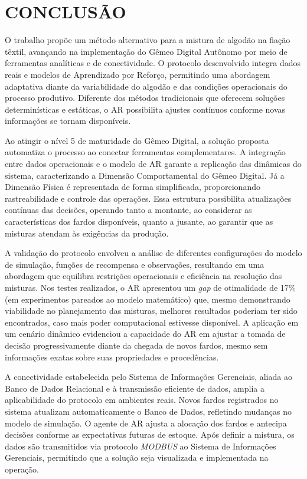 \documentclass[
    12pt,                %
    openright,           %
    oneside,             %
    a4paper,             %
    english,             %
    spanish,             %
    brazil               %
]{ufscar}
\begin{document}
\chapter{CONCLUSÃO}

O trabalho propõe um método alternativo para a mistura de algodão na fiação têxtil, avançando na implementação do Gêmeo Digital Autônomo por meio de ferramentas analíticas e de conectividade. O protocolo desenvolvido integra dados reais e modelos de Aprendizado por Reforço, permitindo uma abordagem adaptativa diante da variabilidade do algodão e das condições operacionais do processo produtivo. Diferente dos métodos tradicionais que oferecem soluções determinísticas e estáticas, o AR possibilita ajustes contínuos conforme novas informações se tornam disponíveis.

Ao atingir o nível 5 de maturidade do Gêmeo Digital, a solução proposta automatiza o processo ao conectar ferramentas complementares. A integração entre dados operacionais e o modelo de AR garante a replicação das dinâmicas do sistema, caracterizando a Dimensão Comportamental do Gêmeo Digital. Já a Dimensão Física é representada de forma simplificada, proporcionando rastreabilidade e controle das operações. Essa estrutura possibilita atualizações contínuas das decisões, operando tanto a montante, ao considerar as características dos fardos disponíveis, quanto a jusante, ao garantir que as misturas atendam às exigências da produção.

A validação do protocolo envolveu a análise de diferentes configurações do modelo de simulação, funções de recompensa e observações, resultando em uma abordagem que equilibra restrições operacionais e eficiência na resolução das misturas. Nos testes realizados, o AR apresentou um \textit{gap} de otimalidade de 17\% (em experimentos pareados ao modelo matemático) que, mesmo demonstrando viabilidade no planejamento das misturas, melhores resultados poderiam ter sido encontrados, caso mais poder computacional estivesse disponível. A aplicação em um cenário dinâmico evidenciou a capacidade do AR em ajustar a tomada de decisão progressivamente diante da chegada de novos fardos, mesmo sem informações exatas sobre suas propriedades e procedências. 

A conectividade estabelecida pelo Sistema de Informações Gerenciais, aliada ao Banco de Dados Relacional e à transmissão eficiente de dados, amplia a aplicabilidade do protocolo em ambientes reais. Novos fardos registrados no sistema atualizam automaticamente o Banco de Dados, refletindo mudanças no modelo de simulação. O agente de AR ajusta a alocação dos fardos e antecipa decisões conforme as expectativas futuras de estoque. Após definir a mistura, os dados são transmitidos via protocolo \textit{MODBUS} ao Sistema de Informações Gerenciais, permitindo que a solução seja visualizada e implementada na operação.
\end{document}
